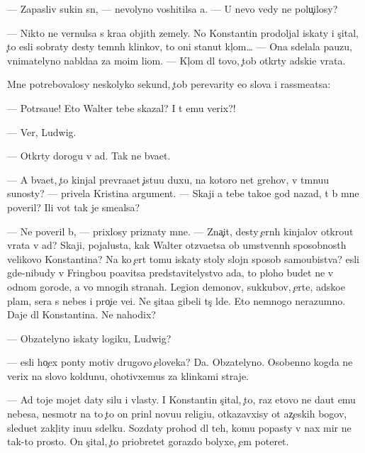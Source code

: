 \documentclass[10pt]{book}
\begin{document}
— Zapasliv{\yi}{\y} sukin s{\yi}n, — nevolyno voshitilsa {\y}a. — U nevo vedy ne polu{\c}ilosy?

— Nikto ne vernulsa s kra{\y}a objit{\yi}h zemely. No Konstantin prodoljal iskaty i s{\c}ital, {\c}to {\y}esli sobraty des{\ia}ty temn{\yi}h klinkov, to oni stanut kl{\iu}{\c}om… — Ona sdelala pauzu, vnimatelyno nabl{\iu}da{\y}a za mo{\y}im li{\q}om. — Kl{\iu}{\c}om dl{\ia} tovo, {\c}tob{\yi} otkr{\yi}ty adski{\y}e vrata.

Mne potrebovalosy neskolyko sekund, {\c}tob{\yi} perevarity {\y}e{\y}o slova i rassme{\y}atsa:

— Potr{\ia}sa{\y}u{\x}e! Eto Walter tebe skazal? I t{\yi} {\y}emu verix?!

— Ver{\iu}, Ludwig.

— Otkr{\yi}ty dorogu v ad. Tak ne b{\yi}va{\y}et.

— A b{\yi}va{\y}et, {\c}to kinjal prevra{\x}a{\y}et {\c}istu{\y}u duxu, na kotoro{\y} net grehov, v t{\e}mnu{\y}u su{\x}nosty? — privela Kristina argument. — Skaji {\y}a tebe tako{\y}e god nazad, t{\yi} b{\yi} mne poveril? Ili vot tak je sme{\y}alsa?

— Ne poveril b{\yi}, — prixlosy priznaty mne. — Zna{\c}it, des{\ia}ty {\c}ern{\yi}h kinjalov otkro{\y}ut vrata v ad? Skaji, pojalu{\y}sta, kak Walter otz{\yi}va{\y}etsa ob umstvenn{\yi}h sposobnost{\ia}h velikovo Konstantina? Na ko{\y} {\c}ert tomu iskaty stoly slojn{\yi}{\y} sposob samoubi{\y}stva? {\Y}esli gde-nibudy v Fringbou po{\y}avitsa predstavitelystvo ada, to ploho budet ne v odnom gorode, a vo mnogih stranah. Legion{\yi} demonov, sukkubov, {\c}erte{\y}, adsko{\y}e plam{\ia}, sera s nebes i pro{\c}i{\y}e ve{\x}i. Ne s{\c}ita{\y}a gibeli t{\yi}s{\ia}{\c} l{\iu}de{\y}. Eto nemnogo nerazumno. Daje dl{\ia} Konstantina. Ne nahodix?

— Ob{\ia}zatelyno iskaty logiku, Ludwig?

— {\Y}esli ho{\c}ex pon{\ia}ty motiv{\yi} drugovo {\c}eloveka? Da. Ob{\ia}zatelyno. Osobenno kogda ne verix na slovo koldunu, ohotivxemus{\ia} za klinkami straje{\y}.

— Ad toje mojet daty silu i vlasty. I Konstantin s{\c}ital, {\c}to, raz etovo ne da{\y}ut {\y}emu nebesa, nesmotr{\ia} na to {\c}to on prin{\ia}l novu{\y}u religi{\y}u, otkazavxisy ot {\y}az{\yi}{\c}eskih bogov, sledu{\y}et zakl{\iu}{\c}ity inu{\y}u sdelku. Sozdaty prohod dl{\ia} teh, komu popasty v nax mir ne tak-to prosto. On s{\c}ital, {\c}to priobretet gorazdo bolyxe, {\c}em poter{\ia}{\y}et.
\end{document}
